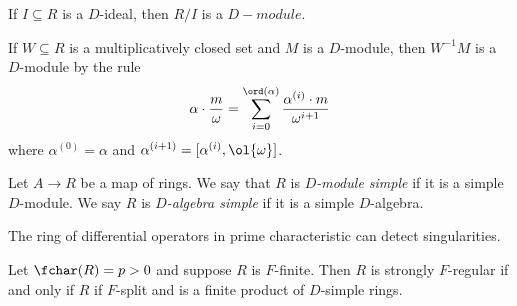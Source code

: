 \begin{example}\label{ex:quotient-is-d-mod}
	If $I \subseteq R$ is a $D$-ideal, then $R/I$ is a $D-module$.
\end{example}

\begin{prop}\label{prop:localization-of-D-mod}
	If $W \subseteq R$ is a multiplicatively closed set and $M$ is a $D$-module, then $W^{-1}M$ is a $D$-module by the rule
	\begin{align*}
		\alpha\cdot \frac{m}{\omega} = \sum_{i = 0}^{\ord(\alpha)} \frac{\alpha^{(i)}\cdot m}{\omega^{i+1}}
	\end{align*}
	where $\alpha^{(0)} = \alpha$ and $\alpha^{(i+1)} = [\alpha^{(i)}, \ol{\omega}]$.
\end{prop}

\begin{defn}\label{defn:D-module-simple}
	Let $A\to R$ be a map of rings. We say that $R$ is \emph{$D$-module simple} if it is a simple $D$-module. We say $R$ is \emph{$D$-algebra simple} if it is a simple $D$-algebra.
\end{defn}

The ring of differential operators in prime characteristic can detect singularities. 

\begin{thm}\label{thm:strongly-F-regular-rings-D-simple}
	Let $\fchar(R) = p > 0$ and suppose $R$ is $F$-finite. Then $R$ is strongly $F$-regular if and only if $R$ if $F$-split and is a finite product of $D$-simple rings.
\end{thm}
\newpage
\printbibliography

